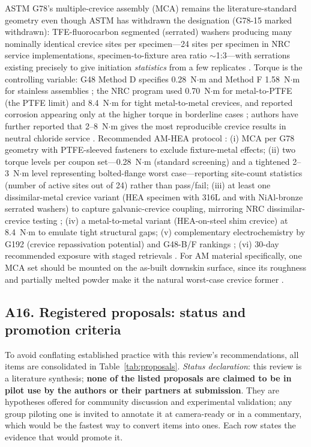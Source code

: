 ASTM G78's multiple-crevice assembly (MCA) remains the literature-standard geometry even though ASTM has withdrawn the designation (G78-15 marked withdrawn): TFE-fluorocarbon segmented (serrated) washers producing many nominally identical crevice sites per specimen---24 sites per specimen in NRC service implementations, specimen-to-fixture area ratio $\sim$1:3---with serrations existing precisely to give initiation \emph{statistics} from a few replicates \cite{nrc_g78,crevice_review2019}. Torque is the controlling variable: G48 Method D specifies 0.28~N$\cdot$m and Method F 1.58~N$\cdot$m for stainless assemblies \cite{astm_g48,crevice_review2019}; the NRC program used 0.70~N$\cdot$m for metal-to-PTFE (the PTFE limit) and 8.4~N$\cdot$m for tight metal-to-metal crevices, and reported corrosion appearing only at the higher torque in borderline cases \cite{nrc_g78}; authors have further reported that 2--8~N$\cdot$m gives the most reproducible crevice results in neutral chloride service \cite{crevice_review2019}. Recommended AM-HEA protocol \prop{}: (i) MCA per G78 geometry with PTFE-sleeved fasteners to exclude fixture-metal effects; (ii) two torque levels per coupon set---0.28~N$\cdot$m (standard screening) and a tightened 2--3~N$\cdot$m level representing bolted-flange worst case---reporting site-count statistics (number of active sites out of 24) rather than pass/fail; (iii) at least one dissimilar-metal crevice variant (HEA specimen with 316L and with NiAl-bronze serrated washers) to capture galvanic-crevice coupling, mirroring NRC dissimilar-crevice testing \cite{nrc_g78}; (iv) a metal-to-metal variant (HEA-on-steel shim crevice) at 8.4~N$\cdot$m to emulate tight structural gaps; (v) complementary electrochemistry by G192 (crevice repassivation potential) and G48-B/F rankings \cite{astm_g192,astm_g48}; (vi) 30-day recommended exposure with staged retrievals \cite{crevice_review2019,astm_g78}. For AM material specifically, one MCA set should be mounted on the as-built downskin surface, since its roughness and partially melted powder make it the natural worst-case crevice former \cite{jom_pitting_review2022}.

\subsection{A16. Registered proposals: status and promotion criteria}
\label{sec:a16}

To avoid conflating established practice with this review's recommendations, all \prop{} items are consolidated in Table~\ref{tab:proposals}. \emph{Status declaration}: this review is a literature synthesis; \textbf{none of the listed proposals are claimed to be in pilot use by the authors or their partners at submission}. They are hypotheses offered for community discussion and experimental validation; any group piloting one is invited to annotate it at camera-ready or in a commentary, which would be the fastest way to convert \prop{} items into \evid{} ones. Each row states the evidence that would promote it.


